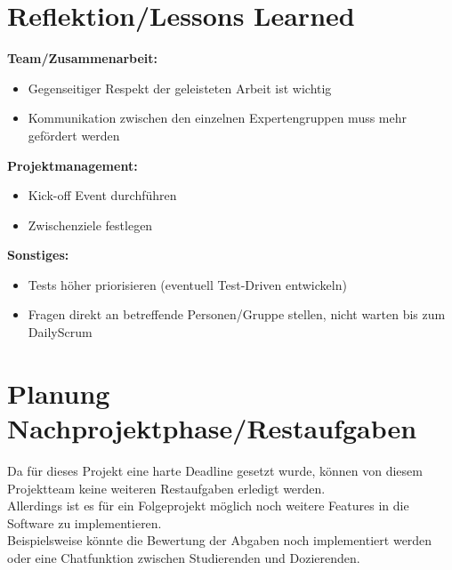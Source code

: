 \section{Reflektion/Lessons Learned}

\textbf{Team/Zusammenarbeit:}\\
\begin{itemize}
\item Gegenseitiger Respekt der geleisteten Arbeit ist wichtig 
\item Kommunikation zwischen den einzelnen Expertengruppen muss mehr gefördert werden
\end{itemize}

\textbf{Projektmanagement:}
\begin{itemize}
\item Kick-off Event durchführen
\item Zwischenziele festlegen
\end{itemize}

\textbf{Sonstiges:}\\
\begin{itemize}
\item Tests höher priorisieren (eventuell Test-Driven entwickeln)
\item Fragen direkt an betreffende Personen/Gruppe stellen, nicht warten bis zum DailyScrum
\end{itemize}

\section{Planung Nachprojektphase/Restaufgaben}

Da für dieses Projekt eine harte Deadline gesetzt wurde, können von diesem Projektteam keine weiteren Restaufgaben erledigt werden. \\
Allerdings ist es für ein Folgeprojekt möglich noch weitere Features in die Software zu implementieren. \\
Beispielsweise könnte die Bewertung der Abgaben noch implementiert werden oder eine Chatfunktion zwischen Studierenden und Dozierenden.